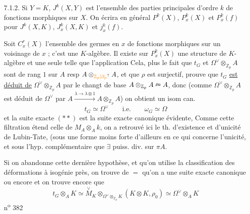 7.1.2. Si $Y=K$, $J^k(X,Y)$ est l'ensemble des parties principales d'ordre $k$ de fonctions morphiques sur $X$. On écrira en général $P^k(X)$, $P^k_x(X)$ et $P^k_x(f)$ pour $J^k(X,K)$, $J^k_x(X,K)$ et $j^k_x(f)$.

Soit $C^r_x(X)$ l'ensemble des germes en $x$ de fonctions morphiques sur un voisinage de $x$ ; c'est une $K$-algèbre. Il existe sur $P^k_x(X)$ une structure de $K$-algèbre et une seule telle que l'application
Cela, plus le fait que $t_G$ et $\Omega^\vee\otimes_{\mathbb Z_p}A$ sont de rang $1$ sur $A$ resp $A\otimes_{\unsure{\mathbb Z_p|\partial_p}}A$, et que $\rho$ est surjectif, prouve que $t_G$ \uline{est déduit de} $\Omega^\vee\otimes_{\mathbb Z_p}A$ par le changt de base $A\otimes_{\mathbb Z_p}A\mathrel{\overset{\rho_0}{\relbar}}A$, donc  (comme $\Omega^\vee\otimes_{\mathbb Z_p}A$ est déduit de $\Omega^\vee$ par $A\xrightarrow{\lambda\to\lambda\otimes 1}A\otimes_{\mathbb Z_p}A$) on obtient un isom can.
\[
t_G\simeq\Omega^\vee\qquad\text{i.e.}\qquad\omega_G\simeq\Omega
\]
et la suite exacte $(**)$ est la suite exacte canonique évidente,  Comme cette filtration étend celle de $M_A\otimes_A k$, on a retrouvé ici le th. d'existence et d'unicité de Lubin-Tate, (sous une forme moins forte d'ailleurs en ce qui concerne l'unicité, et sous l'hyp. complémentaire que $\exists$ puiss. div. sur $\pi A$.

Si on abandonne cette dernière hypothèse, et qu'on utilise la classification des déformations à isogénie près, on trouve de $=$ qu'on a une suite exacte canonique
ou encore
et on trouve encore que
\[
t_G\otimes_A K\simeq\overset{\vee}{M}_K\otimes_{\Omega^\vee\otimes_{\mathbb Z_p}K}(K\otimes K,\rho_0)\simeq\Omega^\vee\otimes_A K
\]
\hfill n\textsuperscript{o} 382

